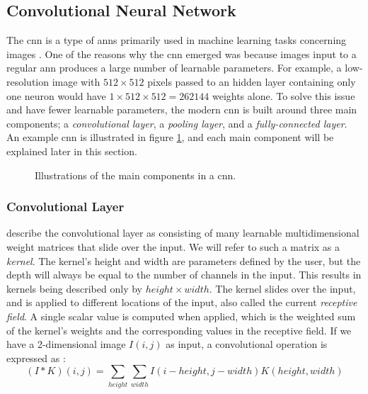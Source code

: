 \subsection{Convolutional Neural Network} \label{cnn}
    The \gls{cnn} is a type of \gls{ann}s primarily used in machine learning tasks concerning images \cite{o2015introduction_convolutions}. One of the reasons why the \gls{cnn} emerged was because images input to a regular \gls{ann} produces a large number of learnable parameters. For example, a low-resolution image with $512\times512$ pixels passed to an hidden layer containing only one neuron would have $1\times512\times512 = 262144$ weights alone.  To solve this issue and have fewer learnable parameters, the modern \gls{cnn} is built around three main components; a \textit{convolutional layer}, a \textit{pooling layer}, and a \textit{fully-connected layer}. An example \gls{cnn} is illustrated in figure \ref{convolutional_neural_network_fig}, and each main component will be explained later in this section.

    \begin{figure}[H]
        \centering
                        
        \caption[Convolutional neural network example]{Illustrations of the main components in a \gls{cnn}.}
      	\medskip 
        \label{convolutional_neural_network_fig}
    \end{figure}



    \subsubsection{Convolutional Layer}
    
    
     \citeauthor{o2015introduction_convolutions} \cite{o2015introduction_convolutions} describe the convolutional layer as consisting of many learnable multidimensional weight matrices that slide over the input. We will refer to such a matrix as a \textit{kernel}. The kernel's height and width are parameters defined by the user, but the depth will always be equal to the number of channels in the input. This results in kernels being described only by $height \times width$. The kernel slides over the input, and is applied to different locations of the input, also called the current \textit{receptive field}. A single scalar value is computed when applied, which is the weighted sum of the kernel's weights and the corresponding values in the receptive field. If we have a 2-dimensional image $I(i,j)$ as input, a convolutional operation is expressed as \cite{Goodfellow-et-al-2016}:
        \begin{equation}
            (I*K)(i,j) = \sum_{height}\sum_{width}I(i-height,j-width)K(height,width)
        \end{equation}
     
